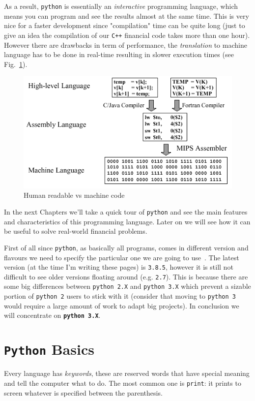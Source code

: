 As a result, \texttt{python} is essentially an \emph{interactive} programming language, which means you can program and see the results almost at the same time. This is very nice for a faster development since "compilation" time can be quite long (just to give an idea the compilation of our \texttt{C++} financial code takes more than one hour).
However there are drawbacks in term of performance, the \emph{translation} to machine language has to be done in real-time resulting in slower execution times (see Fig.~\ref{fig:compilation}).

\begin{figure}[h]
\centering
\includegraphics[width=0.5\linewidth]{figures/machine_language.png}
\caption{Human readable vs machine code}
\label{fig:compilation}
\end{figure}

In the next Chapters we'll take a quick tour of \texttt{python} and see the main features and characteristics of this programming language. Later on we will see how it can be useful to solve real-world financial problems.

First of all since \texttt{python}, as basically all programs, comes in different version and flavours we need to specify the particular one we are going to use~\cite{python_versions}.
The latest version (at the time I'm writing these pages) is \texttt{3.8.5}, however it is still not difficult to see older versions floating around (e.g. \texttt{2.7}).
This is because there are some big differences between \texttt{python 2.X} and \texttt{python 3.X} which prevent a sizable portion of \texttt{python 2} users to stick with it (consider that moving to \texttt{python 3} would require a large amount of work to adapt big projects).
In conclusion we will concentrate on \textbf{\texttt{python~3.X}}.

\section{\texttt{Python} Basics}
\label{python-basics}

Every language has \emph{keywords}, these are reserved words that have special meaning and tell the computer what to do. The most common one is \texttt{print}: it prints to screen whatever is specified between the parenthesis.

